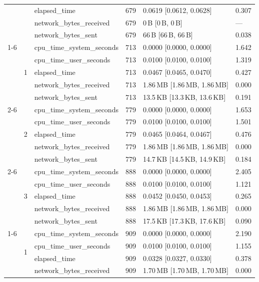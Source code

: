 \begin{tabular}{lllrll}
 &  & elapsed_time & 679 & 0.0619 [0.0612, 0.0628] & 0.307 \\
 &  & network_bytes_received & 679 & 0\,B [0\,B, 0\,B] & --- \\
 &  & network_bytes_sent & 679 & 66\,B [66\,B, 66\,B] & 0.038 \\
\cline{1-6} \cline{2-6}
\multirow[t]{15}{*}{bbox-filtering-postgis-large} & \multirow[t]{5}{*}{1} & cpu_time_system_seconds & 713 & 0.0000 [0.0000, 0.0000] & 1.642 \\
 &  & cpu_time_user_seconds & 713 & 0.0100 [0.0100, 0.0100] & 1.319 \\
 &  & elapsed_time & 713 & 0.0467 [0.0465, 0.0470] & 0.427 \\
 &  & network_bytes_received & 713 & 1.86\,MB [1.86\,MB, 1.86\,MB] & 0.000 \\
 &  & network_bytes_sent & 713 & 13.5\,KB [13.3\,KB, 13.6\,KB] & 0.191 \\
\cline{2-6}
 & \multirow[t]{5}{*}{2} & cpu_time_system_seconds & 779 & 0.0000 [0.0000, 0.0000] & 1.653 \\
 &  & cpu_time_user_seconds & 779 & 0.0100 [0.0100, 0.0100] & 1.501 \\
 &  & elapsed_time & 779 & 0.0465 [0.0464, 0.0467] & 0.476 \\
 &  & network_bytes_received & 779 & 1.86\,MB [1.86\,MB, 1.86\,MB] & 0.000 \\
 &  & network_bytes_sent & 779 & 14.7\,KB [14.5\,KB, 14.9\,KB] & 0.184 \\
\cline{2-6}
 & \multirow[t]{5}{*}{3} & cpu_time_system_seconds & 888 & 0.0000 [0.0000, 0.0000] & 2.405 \\
 &  & cpu_time_user_seconds & 888 & 0.0100 [0.0100, 0.0100] & 1.121 \\
 &  & elapsed_time & 888 & 0.0452 [0.0450, 0.0453] & 0.265 \\
 &  & network_bytes_received & 888 & 1.86\,MB [1.86\,MB, 1.86\,MB] & 0.000 \\
 &  & network_bytes_sent & 888 & 17.5\,KB [17.3\,KB, 17.6\,KB] & 0.090 \\
\cline{1-6} \cline{2-6}
\multirow[t]{15}{*}{bbox-filtering-postgis-small} & \multirow[t]{5}{*}{1} & cpu_time_system_seconds & 909 & 0.0000 [0.0000, 0.0000] & 2.190 \\
 &  & cpu_time_user_seconds & 909 & 0.0100 [0.0100, 0.0100] & 1.155 \\
 &  & elapsed_time & 909 & 0.0328 [0.0327, 0.0330] & 0.378 \\
 &  & network_bytes_received & 909 & 1.70\,MB [1.70\,MB, 1.70\,MB] & 0.000 \\

\end{tabular}
